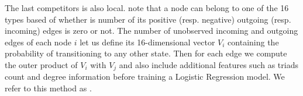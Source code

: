The last competitors is also local. \textcite{Bayesian15} note that  a node can belong to one of the
16 types based of whether is number of its positive (resp.  negative) outgoing (resp. incoming)
edges is zero or not.  The number of unobserved incoming and outgoing edges of each node $i$ let us
define its 16-dimensional vector $V_i$ containing the probability of transitioning to any other
state.  Then for each edge \eij we compute the outer product of $V_i$ with $V_j$ and also include
additional features such as triads count and degree information before training a Logistic
Regression model. We refer to this method as \emph{\compbayesian{}}.
\fi
